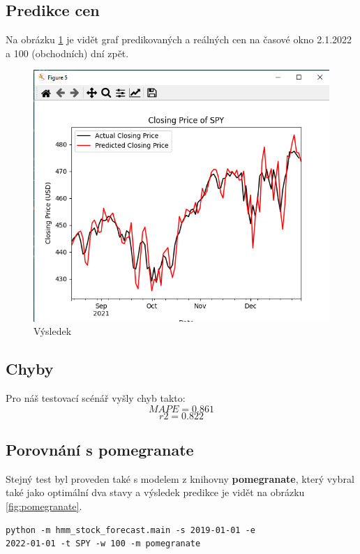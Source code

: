\subsection{Predikce cen}
Na obrázku \ref{fig:result} je vidět graf predikovaných a reálných cen na časové okno 2.1.2022 a 100 (obchodních) dní zpět.

\begin{figure}[h]
    \includegraphics[width=1\textwidth]{img/result}
    \caption{Výsledek}
    \label{fig:result}
\end{figure}

\subsection{Chyby}
Pro náš testovací scénář vyšly chyb takto:
\[MAPE = 0.861\]
\[r2 = 0.822\]

\subsection{Porovnání s pomegranate}
Stejný test byl proveden také s modelem z knihovny \textbf{pomegranate}, který vybral také jako optimální dva stavy a
výsledek predikce je vidět na obrázku \ref{fig:pomegranate}.
\begin{lstlisting}
python -m hmm_stock_forecast.main -s 2019-01-01 -e
2022-01-01 -t SPY -w 100 -m pomegranate
\end{lstlisting}

